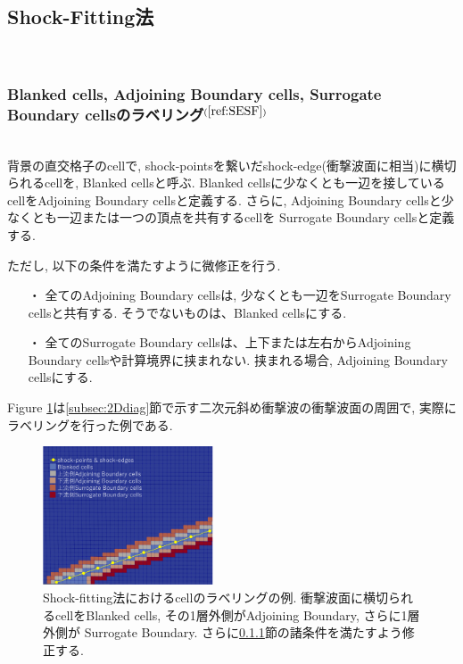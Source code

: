 \documentclass[a4j]{jarticle}
\begin{document}
\subsection{Shock-Fitting法} \label{subsec:SF}
\mbox{}\\[-3.0ex]

\subsubsection{Blanked cells, Adjoining Boundary cells, Surrogate Boundary cellsのラベリング$^{(\ref{ref:SESF})}$} \label{subsubsec:boundary}
\mbox{}\\[1.0ex]
背景の直交格子のcellで, shock-pointsを繋いだshock-edge(衝撃波面に相当)に横切られるcellを,
Blanked cellsと呼ぶ. 
Blanked cellsに少なくとも一辺を接しているcellをAdjoining Boundary cellsと定義する.
さらに, Adjoining Boundary cellsと少なくとも一辺または一つの頂点を共有するcellを
Surrogate Boundary cellsと定義する.

ただし, 以下の条件を満たすように微修正を行う.
\begin{itemize}
  \item[・]  全てのAdjoining Boundary cellsは, 少なくとも一辺をSurrogate Boundary cellsと共有する.
  そうでないものは、Blanked cellsにする.
  \item[・]  全てのSurrogate Boundary cellsは、上下または左右からAdjoining Boundary cellsや計算境界に挟まれない.
  挟まれる場合, Adjoining Boundary cellsにする.
\end{itemize}
Figure \ref{fig:grouping}は\ref{subsec:2Ddiag}節で示す二次元斜め衝撃波の衝撃波面の周囲で, 実際にラベリングを行った例である.
\begin{figure}[h]
    \begin{center}
        \includegraphics[width=0.45\textwidth]{grouping.pdf}
    \end{center}
    \caption{Shock-fitting法におけるcellのラベリングの例.
    衝撃波面に横切られるcellをBlanked cells, その1層外側がAdjoining Boundary, さらに1層外側が
    Surrogate Boundary. さらに\ref{subsubsec:boundary}節の諸条件を満たすよう修正する.}
    \label{fig:grouping}
\end{figure}
\end{document}

